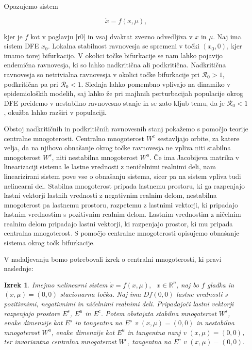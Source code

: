 \documentclass[a4paper,12pt]{article}
\newcommand{\R}{\mathcal R}
\newtheorem{izrek}{Izrek}
\begin{document}
Opazujemo sistem 

\begin{equation}\label{eq4}
\dot{x}=f(x,\mu),
\end{equation}

kjer je \(f\) kot v poglavju \ref{r0} in vsaj dvakrat zvezno odvedljiva v \(x\) in \(\mu\).
Naj ima sistem DFE \(x_0\). Lokalna stabilnost ravnovesja se spremeni v točki \((x_0,0)\), kjer 
imamo torej bifurkacijo. V okolici točke bifurkacije se nam lahko pojavijo endemična 
ravnovesja, ki so lahko nadkritična ali podkritična. Nadkritična ravnovesja so 
netrivialna ravnovesja v okolici točke bifurkacije pri \(\R_0>1\),
podkritična pa pri \(\R_0<1\). Slednja lahko pomembno vplivajo na dinamiko v 
epidemioloških modelih, saj lahko že pri majhnih perturbacijah populacije okrog DFE preidemo
v nestabilno ravnovesno stanje in se zato kljub temu, da je \(\R_0<1\), okužba lahko 
razširi v populaciji.

Obstoj nadkritičnih in podkritičnih ravnovesnih stanj pokažemo s pomočjo teorije 
centralne mnogoterosti. Centralno mnogoterost \(W^c\) sestavljajo orbite, za katere velja, da na 
njihovo obnašanje okrog točke ravnovesja ne vpliva niti stabilna mnogoterost \(W^s\), niti nestabilna 
mnogoterost \(W^u\). Če ima Jacobijeva matrika v linearizaciji sistema le lastne vrednosti z neničelnimi realnimi deli,
nam linearizirani sistem pove vse o obnašanju sistema, sicer pa na sistem vpliva tudi nelinearni del.
Stabilna mnogoterost pripada lastnemu prostoru, ki ga razpenjajo lastni vektorji 
lastnih vrednosti z negativnim realnim delom, nestabilna mnogoterost pa lastnemu prostoru, razpetemu z 
lastnimi vektorji, ki pripadajo lastnim vrednostim s pozitivnim realnim delom. Lastnim vrednostim z ničelnim 
realnim delom pripadajo lastni vektorji, ki razpenjajo prostor, ki mu pripada centralna mnogoterost. S pomočjo 
centralne mnogoterosti opisujemo obnašanje sistema okrog točk bifurkacije.

V nadaljevanju bomo potrebovali izrek o centralni mnogoterosti, ki pravi naslednje:

\begin{izrek}\label{izrekcm}
    Imejmo nelinearni sistem \(\dot{x}=f(x,\mu),\textrm{ }x\in\mathbb{R}^n\), naj bo \(f\) gladka 
    in \((x,\mu)=(0,0)\) stacionarna točka. Naj ima \(Df(0,0)\) lastne vrednosti s pozitivnimi, negativnimi in 
    ničelnimi realnimi deli. Pripadajoči lastni vektorji razpenjajo prostore \(E^s\), \(E^u\) in \(E^c\). 
    Potem obstajata stabilna mnogoterost \(W^s\), enake dimenzije kot \(E^s\) in tangentna na \(E^s\) v \((x,\mu)=(0,0)\) in nestabilna mnogoterost \(W^u\),
    enake dimenzije kot \(E^u\) in tangentna nanj v \((x,\mu)=(0,0)\), ter invariantna centralna mnogoterost \(W^c\), 
    tangentna na \(E^c\) v \((x,\mu)=(0,0)\).
\end{izrek}
\end{document}
